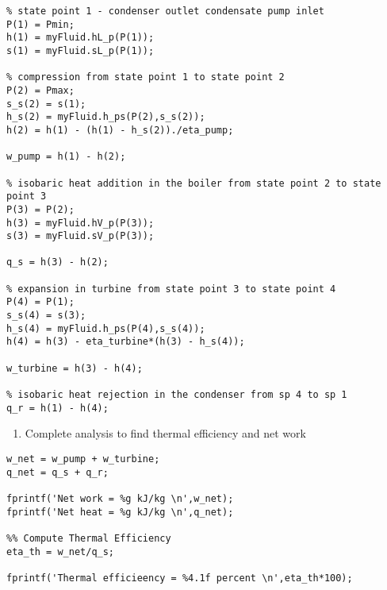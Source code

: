\begin{lstlisting}[caption=Find fluid properties for each state point in a simple Rankine cycle.]
%% calculate properties at state points 
% state point 1 - condenser outlet condensate pump inlet
P(1) = Pmin;
h(1) = myFluid.hL_p(P(1));
s(1) = myFluid.sL_p(P(1));

% compression from state point 1 to state point 2
P(2) = Pmax;
s_s(2) = s(1);
h_s(2) = myFluid.h_ps(P(2),s_s(2));
h(2) = h(1) - (h(1) - h_s(2))./eta_pump;

w_pump = h(1) - h(2);

% isobaric heat addition in the boiler from state point 2 to state point 3
P(3) = P(2);
h(3) = myFluid.hV_p(P(3));
s(3) = myFluid.sV_p(P(3));

q_s = h(3) - h(2);

% expansion in turbine from state point 3 to state point 4
P(4) = P(1);
s_s(4) = s(3);
h_s(4) = myFluid.h_ps(P(4),s_s(4));
h(4) = h(3) - eta_turbine*(h(3) - h_s(4));

w_turbine = h(3) - h(4);

% isobaric heat rejection in the condenser from sp 4 to sp 1
q_r = h(1) - h(4);
\end{lstlisting}

\begin{enumerate}[resume]
\item Complete analysis to find thermal efficiency and net work
\end{enumerate}
\begin{lstlisting}[caption=Analyze for net work and thermal efficiency]
%% First Law Check
w_net = w_pump + w_turbine;
q_net = q_s + q_r;

fprintf('Net work = %g kJ/kg \n',w_net);
fprintf('Net heat = %g kJ/kg \n',q_net);

%% Compute Thermal Efficiency
eta_th = w_net/q_s;

fprintf('Thermal efficieency = %4.1f percent \n',eta_th*100);
\end{lstlisting}

